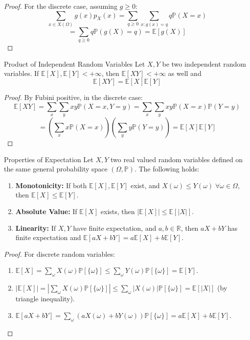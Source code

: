 \documentclass[11pt, a4paper]{article}
\begin{document}
\begin{proof}
For the discrete case, assuming $g \ge 0$:
\[ \sum_{x \in X(\Omega)} g(x) p_X(x) = \sum_{q \ge 0} \sum_{x: g(x)=q} q \mathbb{P}(X=x) \]
\[ = \sum_{q \ge 0} q \mathbb{P}(g(X)=q) = \mathbb{E}[g(X)] \]
\end{proof}

\begin{proposition}{Product of Independent Random Variables}{}
Let $X, Y$ be two independent random variables. If $\mathbb{E}[X], \mathbb{E}[Y] < +\infty$, then $\mathbb{E}[XY] < +\infty$ as well and
\[ \mathbb{E}[XY] = \mathbb{E}[X]\mathbb{E}[Y] \]
\end{proposition}

\begin{proof}
By Fubini positive, in the discrete case:
\[ \mathbb{E}[XY] = \sum_{x} \sum_{y} xy \mathbb{P}(X=x, Y=y) = \sum_{x} \sum_{y} xy \mathbb{P}(X=x)\mathbb{P}(Y=y) \]
\[ = \left( \sum_{x} x \mathbb{P}(X=x) \right) \left( \sum_{y} y \mathbb{P}(Y=y) \right) = \mathbb{E}[X]\mathbb{E}[Y] \]
\end{proof}

\begin{proposition}{Properties of Expectation}{}
Let $X, Y$ two real valued random variables defined on the same general probability space $(\Omega, \mathbb{P})$. The following holds:
\begin{enumerate}
    \item \textbf{Monotonicity:} If both $\mathbb{E}[X], \mathbb{E}[Y]$ exist, and $X(\omega) \le Y(\omega) \; \forall \omega \in \Omega$, then $\mathbb{E}[X] \le \mathbb{E}[Y]$.
    \item \textbf{Absolute Value:} If $\mathbb{E}[X]$ exists, then $|\mathbb{E}[X]| \le \mathbb{E}[|X|]$.
    \item \textbf{Linearity:} If $X, Y$ have finite expectation, and $a, b \in \mathbb{R}$, then $aX + bY$ has finite expectation and $\mathbb{E}[aX + bY] = a\mathbb{E}[X] + b\mathbb{E}[Y]$.
\end{enumerate}
\end{proposition}

\begin{proof}
For discrete random variables:
\begin{enumerate}
    \item $\mathbb{E}[X] = \sum_{\omega} X(\omega) \mathbb{P}[\{\omega\}] \le \sum_{\omega} Y(\omega) \mathbb{P}[\{\omega\}] = \mathbb{E}[Y]$.
    \item $|\mathbb{E}[X]| = \left| \sum_{\omega} X(\omega) \mathbb{P}[\{\omega\}] \right| \le \sum_{\omega} |X(\omega)| \mathbb{P}[\{\omega\}] = \mathbb{E}[|X|]$ (by triangle inequality).
    \item $\mathbb{E}[aX + bY] = \sum_{\omega} (aX(\omega) + bY(\omega)) \mathbb{P}[\{\omega\}] = a\mathbb{E}[X] + b\mathbb{E}[Y]$.
\end{enumerate}
\end{proof}
\end{document}

